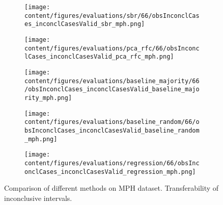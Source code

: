 \begin{figure}[ht]
  \begin{subfigure}{0.45\textwidth}
    \centering
    \texttt{[image: content/figures/evaluations/sbr/66/obsInconclCases\_inconclCasesValid\_sbr\_mph.png]}
  \end{subfigure}
  \hfill
  \begin{subfigure}{0.45\textwidth}
    \centering
    \texttt{[image: content/figures/evaluations/pca\_rfc/66/obsInconclCases\_inconclCasesValid\_pca\_rfc\_mph.png]}
  \end{subfigure}
  \hfill
  \begin{subfigure}{0.45\textwidth}
    \centering
    \texttt{[image: content/figures/evaluations/baseline\_majority/66/obsInconclCases\_inconclCasesValid\_baseline\_majority\_mph.png]}
  \end{subfigure}
  \hfill
  \begin{subfigure}{0.45\textwidth}
    \centering
    \texttt{[image: content/figures/evaluations/baseline\_random/66/obsInconclCases\_inconclCasesValid\_baseline\_random\_mph.png]}
  \end{subfigure}
  \hfill
  \begin{subfigure}{0.45\textwidth}
    \centering
    \texttt{[image: content/figures/evaluations/regression/66/obsInconclCases\_inconclCasesValid\_regression\_mph.png]}
  \end{subfigure}

  \caption{Comparison of different methods on MPH dataset. Transferability of inconclusive intervals.}
  \label{fig:test_interval_match_mph}
\end{figure}



